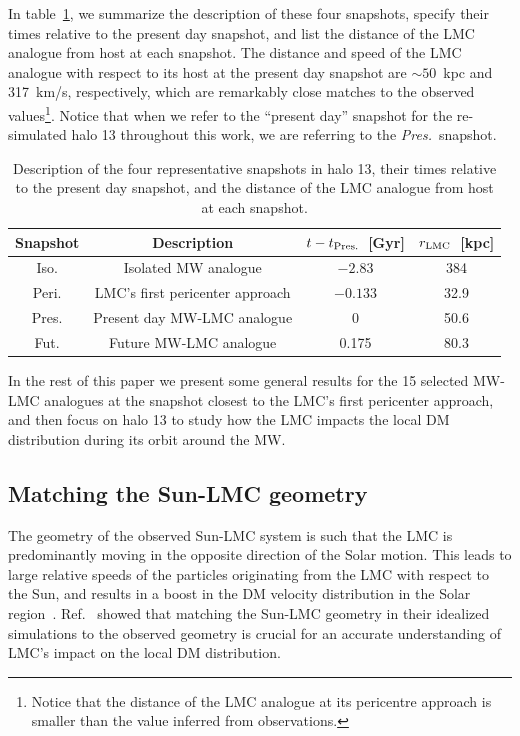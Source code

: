  In table~\ref{tab:snapshots}, we summarize the description of these four snapshots, specify their times relative to the present day snapshot, and list the distance of the LMC analogue from host at each snapshot. The distance and speed of the LMC analogue with respect to its host at the present day snapshot are $\sim 50$~kpc and 317~km/s, respectively, which are remarkably close matches to the observed values\footnote{Notice that the distance of the LMC analogue at its pericentre approach is smaller than the value inferred from observations.}. Notice that when we refer to the ``present day'' snapshot for the re-simulated halo 13 throughout this work, we are referring to the \emph{Pres.}~snapshot. 

   \begin{table}[t]
    \centering
    \begin{tabular}{|c|c|c|c|}
      \hline
       Snapshot & Description & $t-t_{\rm Pres.}$~[Gyr] & $r_{\rm LMC}$~[kpc] \\
       \hline
       Iso. & Isolated MW analogue & $-2.83$ & 384  \\
       Peri. & LMC's first pericenter approach & $-0.133$ & 32.9\\
       Pres.  & Present day MW-LMC analogue & 0 & 50.6 \\
       Fut. & Future MW-LMC analogue & 0.175 & 80.3\\
      \hline
    \end{tabular}
\caption{Description of the four representative snapshots in halo 13, their times relative to the present day snapshot, and the distance of the LMC analogue from host at each snapshot.
}
\label{tab:snapshots}
\end{table}


In the rest of this paper we present some general results for the 15 selected MW-LMC analogues at the snapshot closest to the LMC's first pericenter approach, and then focus on halo 13 to study how the LMC impacts the local DM distribution during its orbit around the MW.




\subsection{Matching the Sun-LMC geometry}
\label{sec: Sun-LMC Geometry}



The geometry of the observed Sun-LMC system is such that the LMC is predominantly moving in the opposite direction of the Solar motion. This leads to large relative speeds of the particles originating from the LMC with respect to the Sun, and results in a boost in the DM velocity distribution in the Solar region~\cite{Besla:2019xbx}. Ref.~\cite{Besla:2019xbx} showed that matching the Sun-LMC geometry in their idealized simulations to the observed geometry is crucial for an accurate understanding of LMC's impact on the local DM distribution.


